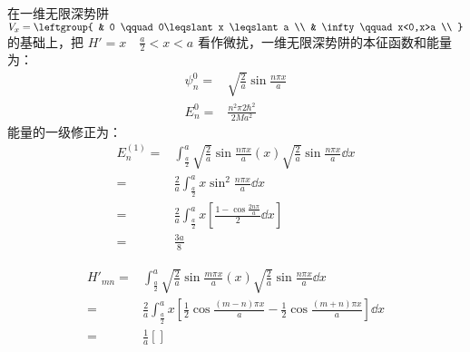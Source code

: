 \subsection{ }
在一维无限深势阱 $V_{x} = \leftgroup{
    & 0 \qquad 0\leqslant x \leqslant a \\
    & \infty \qquad x<0,x>a \\
}$ 的基础上，把 $H' = x \quad \frac{a}{2} < x < a $ 看作微扰，一维无限深势阱的本征函数和能量为：\\
\begin{align}
\psi^{0}_{n}=& \sqrt{\frac{2}{a}} \sin{\frac{n\pi x}{a}}\\
E^{0}_{n}=& \frac{n^{2}\pi{2}\hbar^{2}}{2Ma^2}
\end{align}
能量的一级修正为：\\
\begin{equation}
\begin{aligned}
E^{(1)}_{n}=&\int^{a}_{\frac{a}{2}} \sqrt{\frac{2}{a}} \sin{\frac{n\pi x}{a}}(x)\sqrt{\frac{2}{a}} \sin{\frac{n\pi x}{a}} \dd{x} \\
=& \frac{2}{a} \int^{a}_{\frac{a}{2}} x\sin^{2}{\frac{n\pi x}{a}} \dd{x} \\
=& \frac{2}{a}\int^{a}_{\frac{a}{2}} x[\frac{1-\cos{\frac{2n \pi}{a}}}{2}\dd x] \\
=& \frac{3a}{8}
\end{aligned}
\end{equation}

\begin{equation}
\begin{aligned}
H'_{mn} =& \int^{a}_{\frac{a}{2}} \sqrt{\frac{2}{a}} \sin{\frac{m \pi x}{a}} (x) \sqrt{\frac{2}{a} }\sin{\frac{n \pi x}{a}} \dd x \\
=& \frac{2}{a} \int^{a}_{\frac{a}{2}} x[\frac{1}{2} \cos{\frac{(m-n)\pi x}{a}} - \frac{1}{2} \cos{\frac{(m+n) \pi x}{a}}] \dd x \\
=& \frac{1}{a} []
\end{aligned}
\end{equation}
